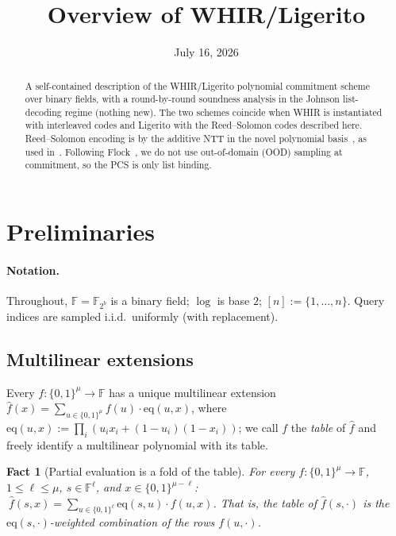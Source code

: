 \documentclass[11pt]{article}
\title{\textbf{Overview of WHIR/Ligerito}}
\author{}
\date{July 16, 2026}
\newcommand{\F}{\mathbb{F}}
\newcommand{\eq}{\mathrm{eq}}
\newcommand{\cube}[1]{\{0,1\}^{#1}}
\newcommand{\pol}[1]{\widehat{#1}}
\theoremstyle{plain}
\newtheorem{fact}[theorem]{Fact}
\theoremstyle{definition}
\theoremstyle{remark}
\begin{document}
\maketitle

\begin{center}
\end{center}

\begin{abstract}
\noindent
A self-contained description of the WHIR\slash Ligerito polynomial commitment scheme \cite{ACFY25,NA25} over binary fields, with a round-by-round soundness analysis in the Johnson list-decoding regime (nothing new). The two schemes coincide when WHIR is instantiated with interleaved codes and Ligerito with the Reed--Solomon codes described here. Reed--Solomon encoding is by the additive NTT in the novel polynomial basis~\cite{LCH14}, as used in~\cite{DP26}. Following Flock~\cite{Flock26}, we do not use out-of-domain (OOD) sampling at commitment, so the PCS is only list binding.
\end{abstract}

\section{Preliminaries}\label{sec:prelims}

\paragraph{Notation.}
Throughout, $\F = \F_{2^b}$ is a binary field; $\log$ is base $2$; $[n] := \{1,\dots,n\}$. Query indices are sampled i.i.d.\ uniformly (with replacement).

\subsection{Multilinear extensions}

Every $f : \cube{\mu} \to \F$ has a unique multilinear extension $\pol{f}(x) = \sum_{u \in \cube{\mu}} f(u) \cdot \eq(u, x)$, where $\eq(u, x) := \prod_{i}(u_i x_i + (1-u_i)(1-x_i))$; we call $f$ the \emph{table} of $\pol{f}$ and freely identify a multilinear polynomial with its table.

\begin{fact}[Partial evaluation is a fold of the table]\label{fact:fold}
For every $f : \cube{\mu} \to \F$, $1 \le \ell \le \mu$, $s \in \F^{\ell}$, and $x \in \cube{\mu - \ell}$: $\ \pol{f}(s, x) = \sum_{u \in \cube{\ell}} \eq(s, u) \cdot f(u, x)$. That is, the table of $\pol{f}(s, \cdot)$ is the $\eq(s, \cdot)$-weighted combination of the rows $f(u, \cdot)$.
\end{fact}
\end{document}
